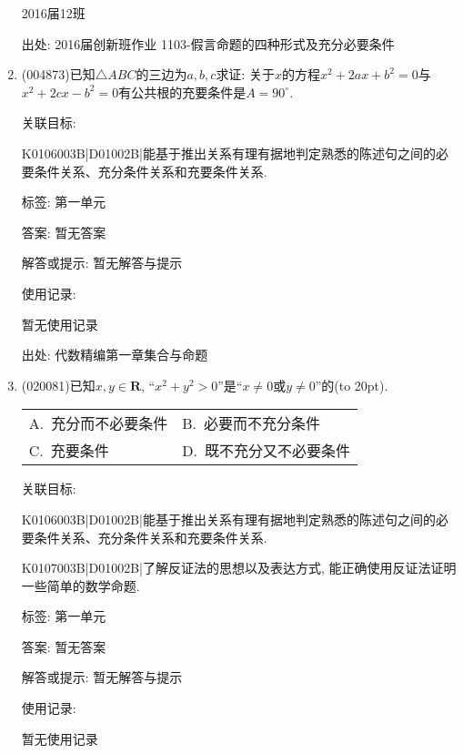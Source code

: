 \documentclass[10pt,a4paper]{article}
\newcommand{\bracket}[1]{(\hbox to #1pt{})}
\newcommand{\twoch}[4]{\par\begin{tabular}{p{.46\textwidth}p{.46\textwidth}}
A.~#1& B.~#2\\
C.~#3& D.~#4
\end{tabular}}
\begin{document}
\begin{enumerate}[1.]
2016届12班													


出处: 2016届创新班作业	1103-假言命题的四种形式及充分必要条件
\item { (004873)}已知$\triangle ABC$的三边为$a,b,c$求证: 关于$x$的方程$x^2+2ax+b^2=0$与$x^2+2cx-b^2=0$有公共根的充要条件是$A=90^\circ$.


关联目标:

K0106003B|D01002B|能基于推出关系有理有据地判定熟悉的陈述句之间的必要条件关系、充分条件关系和充要条件关系.



标签: 第一单元

答案: 暂无答案

解答或提示: 暂无解答与提示

使用记录:

暂无使用记录


出处: 代数精编第一章集合与命题
\item { (020081)}已知$x,y\in \mathbf{R}$, ``$x^2+y^2>0$''是``$x\ne 0$或$y\ne 0$''的\bracket{20}.
\twoch{充分而不必要条件}{必要而不充分条件}{充要条件}{既不充分又不必要条件}


关联目标:

K0106003B|D01002B|能基于推出关系有理有据地判定熟悉的陈述句之间的必要条件关系、充分条件关系和充要条件关系.

K0107003B|D01002B|了解反证法的思想以及表达方式, 能正确使用反证法证明一些简单的数学命题.



标签: 第一单元

答案: 暂无答案

解答或提示: 暂无解答与提示

使用记录:

暂无使用记录



\end{enumerate}
\end{document}
